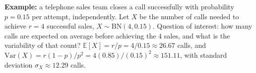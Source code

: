 \begin{solproblema}[prob:4c2c37d]
	\textbf{Example:} a telephone sales team closes a call successfully with probability $p=0.15$ per attempt, independently. Let $X$ be the number of calls needed to achieve $r=4$ successful sales, $X\sim\text{BN}(4, 0.15)$. Question of interest: how many calls are expected on average before achieving the $4$ sales, and what is the variability of that count? $\mathbb{E}[X] = r/p = 4/0.15 \approx 26.67$ calls, and $\text{Var}(X) = r(1-p)/p^2 = 4(0.85)/(0.15)^2 \approx 151.11$, with standard deviation $\sigma_X \approx 12.29$ calls.
\end{solproblema}

